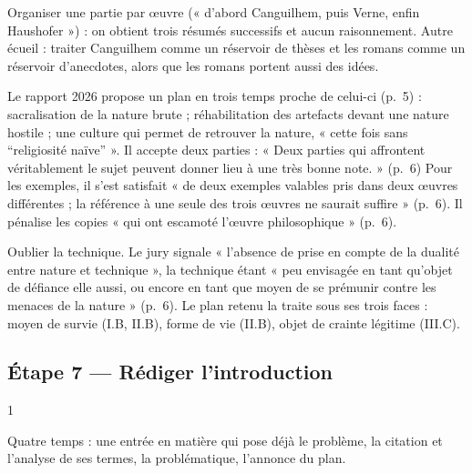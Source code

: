 \documentclass[11pt,a4paper]{article}
\begin{document}
\begin{piege}

Organiser une partie par œuvre (« d'abord Canguilhem, puis Verne, enfin Haushofer ») : on obtient trois résumés successifs et aucun raisonnement. Autre écueil : traiter Canguilhem comme un réservoir de thèses et les romans comme un réservoir d'anecdotes, alors que les romans portent aussi des idées.

\end{piege}

\begin{jury}

Le rapport 2026 propose un plan en trois temps proche de celui-ci (p.~5) : sacralisation de la nature brute ; réhabilitation des artefacts devant une nature hostile ; une culture qui permet de retrouver la nature, « cette fois sans ``religiosité naïve'' ». Il accepte deux parties : « Deux parties qui affrontent véritablement le sujet peuvent donner lieu à une très bonne note. » (p.~6) Pour les exemples, il s'est satisfait « de deux exemples valables pris dans deux œuvres différentes ; la référence à une seule des trois œuvres ne saurait suffire » (p.~6). Il pénalise les copies « qui ont escamoté l'œuvre philosophique » (p.~6).

\end{jury}

\begin{piege}

Oublier la technique. Le jury signale « l'absence de prise en compte de la dualité entre nature et technique », la technique étant « peu envisagée en tant qu'objet de défiance elle aussi, ou encore en tant que moyen de se prémunir contre les menaces de la nature » (p.~6). Le plan retenu la traite sous ses trois faces : moyen de survie (I.B, II.B), forme de vie (II.B), objet de crainte légitime (III.C).

\end{piege}

\hypertarget{uxe9tape-7-ruxe9diger-lintroduction}{%
\subsection{Étape 7 --- Rédiger l'introduction}\label{uxe9tape-7-ruxe9diger-lintroduction}}

\begin{indication}{1}

Quatre temps : une entrée en matière qui pose déjà le problème, la citation et l'analyse de ses termes, la problématique, l'annonce du plan.

\end{indication}
\end{document}
